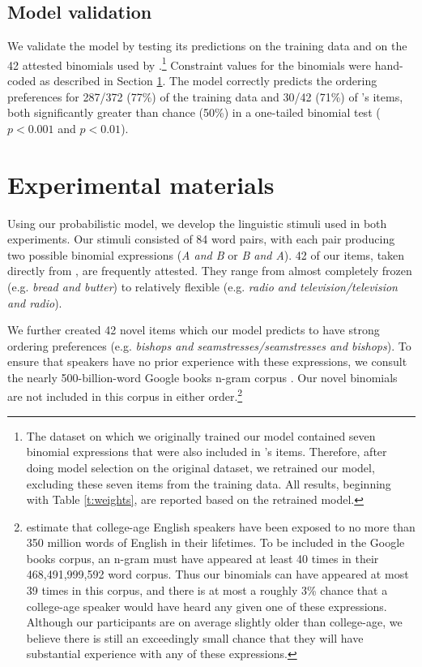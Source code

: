 \documentclass[authoryear]{elsarticle}
\begin{document}
\subsection{Model validation}\label{validation}
We validate the model by testing its predictions on the training data and on the 42 attested binomials used by \citet{SiyanovaChanturia:2011ep}.\footnote{The dataset on which we originally trained our model contained seven binomial expressions that were also included in \citeauthor{SiyanovaChanturia:2011ep}'s \citeyearpar{SiyanovaChanturia:2011ep} items. Therefore, after doing model selection on the original dataset, we retrained our model, excluding these seven items from the training data. All results, beginning with Table \ref{t:weights}, are reported based on the retrained model.} Constraint values for the \citeauthor{SiyanovaChanturia:2011ep} binomials were hand-coded as described in Section \ref{materials}. The model correctly predicts the ordering preferences for 287/372 (77\%) of the training data and 30/42 (71\%) of \citeauthor{SiyanovaChanturia:2011ep}'s items, both significantly greater than chance (50\%) in a one-tailed binomial test ($p < 0.001$ and $p < 0.01$).


\section{Experimental materials}\label{materials}
Using our probabilistic model, we develop the linguistic stimuli used in both experiments. Our stimuli consisted of 84 word pairs, with each pair producing two possible binomial expressions (\emph{A and B} or \emph{B and A}). 42 of our items, taken directly from \citet{SiyanovaChanturia:2011ep}, are frequently attested. They range from almost completely frozen (e.g. \emph{bread and butter}) to relatively flexible (e.g. \emph{radio and television/television and radio}).

We further created 42 novel items which our model predicts to have strong ordering preferences (e.g. \emph{bishops and seamstresses/seamstresses and bishops}). To ensure that speakers have no prior experience with these expressions, we consult the nearly 500-billion-word Google books n-gram corpus \citep{Lin:2012te}. Our novel binomials are not included in this corpus in either order.\footnote{\citet{Levy:2012bj} estimate that college-age English speakers have been exposed to no more than 350 million words of English in their lifetimes. To be included in the Google books corpus, an n-gram must have appeared at least 40 times in their 468,491,999,592 word corpus. Thus our binomials can have appeared at most 39 times in this corpus, and there is at most a roughly 3\% chance that a college-age speaker would have heard any given one of these expressions. Although our participants are on average slightly older than college-age, we believe there is still an exceedingly small chance that they will have substantial experience with any of these expressions.} 
\end{document}
